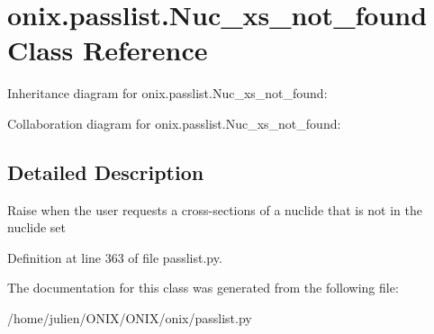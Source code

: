 \hypertarget{classonix_1_1passlist_1_1Nuc__xs__not__found}{}\section{onix.\+passlist.\+Nuc\+\_\+xs\+\_\+not\+\_\+found Class Reference}
\label{classonix_1_1passlist_1_1Nuc__xs__not__found}


Inheritance diagram for onix.\+passlist.\+Nuc\+\_\+xs\+\_\+not\+\_\+found\+:


Collaboration diagram for onix.\+passlist.\+Nuc\+\_\+xs\+\_\+not\+\_\+found\+:


\subsection{Detailed Description}
\begin{DoxyVerb}Raise when the user requests a cross-sections of a nuclide that is not in the nuclide set \end{DoxyVerb}
 

Definition at line 363 of file passlist.\+py.



The documentation for this class was generated from the following file\+:\begin{DoxyCompactItemize}
\item 
/home/julien/\+O\+N\+I\+X/\+O\+N\+I\+X/onix/passlist.\+py\end{DoxyCompactItemize}
